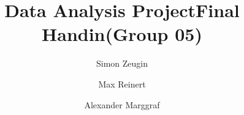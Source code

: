\title{\texorpdfstring{Data Analysis Project\newline Final Handin\newline (Group 05)}
{Data Analysis Project P3: Analysis and Visulalisation (Group 05)}} %
\author{Simon Zeugin \and Max Reinert \and Alexander Marggraf} %

\institute{\lectureInstitute} %
\begin{report}






% 

\end{report}

